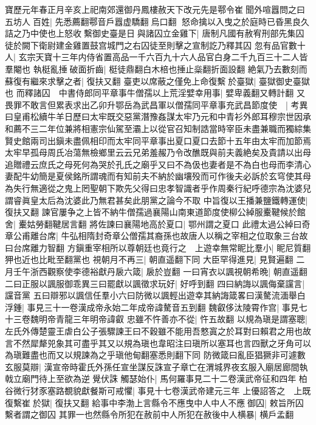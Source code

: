 寶歷元年春正月辛亥上祀南郊還御丹鳳樓赦天下改元先是鄠令崔聞外喧囂問之曰五坊人百姓|{
	先悉薦翻鄠音戶囂虚驕翻烏口翻}
怒命擒以入曳之於庭時已昏黑良久詰之乃中使也上怒收繫御史臺是日與諸囚立金雞下|{
	唐制凡國有赦宥刑部先集囚徒於闕下衛尉建金雞置鼓宫城門之右囚徒至則擊之宣制訖乃釋其囚}
忽有品官數十人|{
	玄宗天寶十三年内侍省置高品一千六百九十六人品官白身二千九百三十二人皆羣閹也}
執梃亂捶破面折齒|{
	梃徒鼎翻白木棓也捶止橤翻折面設翻}
絶氣乃去數刻而蘇復有繼來求擊之者|{
	復扶又翻}
臺吏以席蔽之僅免上命復繫於臺獄|{
	臺獄御史臺獄也}
而釋諸囚　中書侍郎同平章事牛僧孺以上荒淫嬖幸用事|{
	嬖卑義翻又轉計翻}
又畏罪不敢言但累表求出乙卯升鄂岳為武昌軍以僧孺同平章事充武昌節度使　|{
	考異曰皇甫松續牛羊日歷曰太牢既交惡黨潛豫姦謀太牢乃元和中青衫外郎耳穆宗世因承和薦不三二年位兼將相憲宗仙駕至灞上以從官召知制誥當時宰臣未盡兼職而獨綜集賢史館兩司出鎭未盡佩相印而太牢同平章事出夏口夏口去節十五年由太牢而加節焉太牢早孤母周氏冶蕩無檢鄉里云云兄弟羞赧乃令改醮既與前夫義絶矣及貴請以出母追贈禮云庶氏之母死何為哭於孔氏之廟乎又曰不為伋也妻者是不為白也母而李清心妻配牛幼簡是夏侯銘所謂魂而有知前夫不納於幽壤殁而可作後夫必訴於玄穹使其母為失行無適從之鬼上罔聖朝下欺先父得曰忠孝智識者乎作周秦行紀呼德宗為沈婆兒謂睿眞皇太后為沈婆此乃無君甚矣此朋黨之論今不取}
中旨復以王播兼鹽鐵轉運使|{
	復扶又翻}
諫官屢争之上皆不納牛僧孺過襄陽山南東道節度使柳公綽服櫜鞬候於館舍|{
	櫜姑勞翻鞬居言翻}
將佐諫曰襄陽地高於夏口|{
	鄂州謂之夏口}
此禮太過公綽曰奇章公甫離台席|{
	牛弘相隋封奇章公僧孺其裔孫也故唐人以稱之宰相之位取象三台故曰台席離力智翻}
方鎭重宰相所以尊朝廷也竟行之　上遊幸無常眤比羣小|{
	眤尼質翻狎也近也比毗至翻黨也}
視朝月不再三|{
	朝直遥翻下同}
大臣罕得進見|{
	見賢遍翻}
二月壬午浙西觀察使李德裕獻丹扆六箴|{
	扆於豈翻}
一曰宵衣以諷視朝希晩|{
	朝直遥翻}
二曰正服以諷服御乖異三曰罷獻以諷徵求玩好|{
	好呼到翻}
四曰納誨以諷侮棄讜言|{
	讜音黨}
五曰辯邪以諷信任羣小六曰防微以諷輕出遊幸其納誨箴畧曰漢驁流湎舉白浮鍾|{
	事見三十一卷漢成帝永始二年成帝諱驁音五到翻}
魏叡侈汰陵霄作宫|{
	事見七十三卷魏明帝青龍三年明帝諱叡}
忠雖不忤善亦不從|{
	忤五故翻}
以規為瑱是謂塞聰|{
	左氏外傳楚靈王虐白公子張驟諫王曰不穀雖不能用吾憗寘之於耳對曰賴君之用也故言不然犀犛兕象其可盡乎其又以規為瑱也韋昭注曰瑱所以塞耳也言四獸之牙角可以為瑱難盡也而又以規諫為之乎瑱他甸翻塞悉則翻下同}
防微箴曰亂臣猖獗非可遽數玄服莫辯|{
	漢宣帝時霍氏外孫任宣坐謀反誅宣子章亡在渭城界夜玄服入廟居廊間執戟立廟門待上至欲為逆覺伏誅}
觸瑟始仆|{
	馬何羅事見二十二卷漢武帝征和四年}
柏谷微行犲豕塞路覩貌獻餐斯可戒懼|{
	事見十七卷漢武帝建元三年}
上優詔答之　上既復繫崔於獄|{
	復扶又翻}
給事中李渤上言縣令不應曳中人中人不應御囚|{
	敕旨所囚繫者謂之御囚}
其罪一也然縣令所犯在赦前中人所犯在赦後中人横暴|{
	横戶孟翻}
